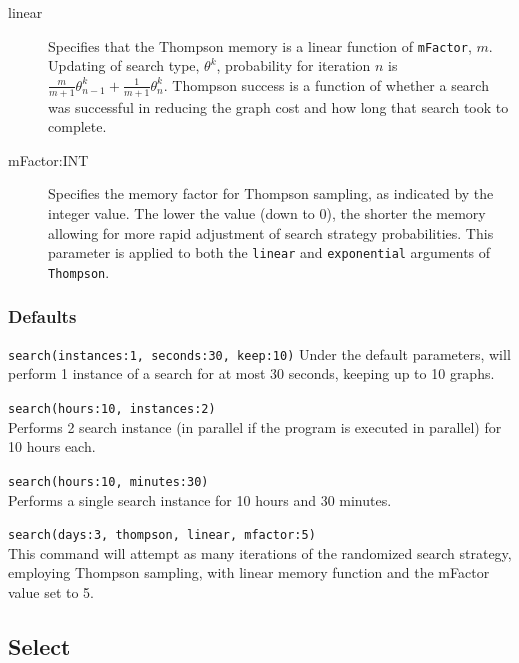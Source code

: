 \begin{description}
\begin{description}
			\item[linear] Specifies that the Thompson memory is a linear function of \texttt{mFactor}, 
			$m$.  Updating of search type, $\theta^k$, probability for iteration $n$ is $\frac{m}{m+1} 
			\theta^k_{n-1} + \frac{1}{m+1} \theta^k_n$.  Thompson success is a function of whether 
			a search was successful in reducing the graph cost and how long that search took to 
			complete.
			
			\item[mFactor:INT] Specifies the memory factor for Thompson sampling, as 
			indicated by the integer value. The lower the value (down to 0), the shorter the memory
			allowing for more rapid adjustment of search strategy probabilities.
			This parameter is applied to both the \texttt{linear}
			and \texttt{exponential} arguments of \texttt{Thompson}.
			\end{description}
	\end{description}		
	
	\subsubsection{Defaults}
		\texttt{search(instances:1, seconds:30, keep:10)} Under the default parameters, 
		\phyg will perform 1 instance of a search for at most 30 seconds, keeping up to 10 graphs.
		
	\begin{example}
		\item{\texttt{search(hours:10, instances:2)}\\ Performs 2 search instance (in parallel if the 
		program is executed in parallel) for 10 hours each.}
				
		\item{\texttt{search(hours:10, minutes:30)}\\ Performs a single search instance for 10 
		hours and 30 minutes.}
		
		\item{\texttt{search(days:3, thompson, linear, mfactor:5)}\\ This command will attempt
		as many iterations of the randomized search strategy, employing Thompson sampling, 
		with linear memory function and the mFactor value set to 5.}
	\end{example}
	
\subsection{Select}
